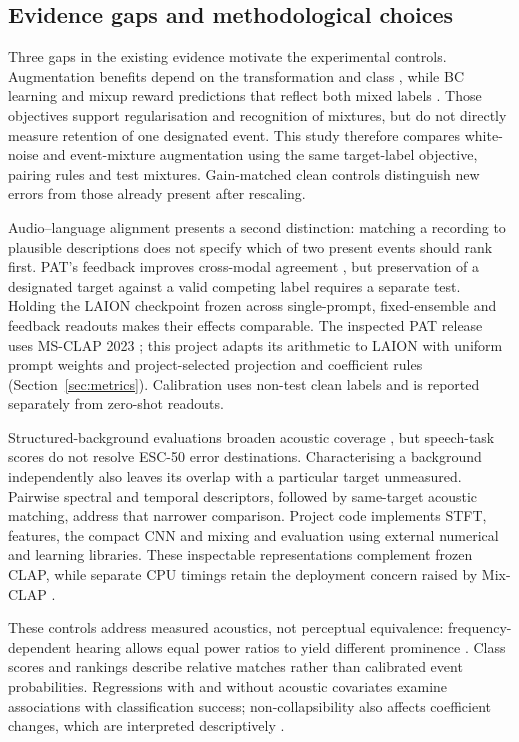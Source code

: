 \documentclass[a4paper,10pt]{article}
\begin{document}
\subsection{Evidence gaps and methodological choices}

Three gaps in the existing evidence motivate the experimental controls. Augmentation benefits depend on the transformation and class \cite{augmentation}, while BC learning and mixup reward predictions that reflect both mixed labels \cite{bc,mixup}. Those objectives support regularisation and recognition of mixtures, but do not directly measure retention of one designated event. This study therefore compares white-noise and event-mixture augmentation using the same target-label objective, pairing rules and test mixtures. Gain-matched clean controls distinguish new errors from those already present after rescaling.

Audio--language alignment presents a second distinction: matching a recording to plausible descriptions does not specify which of two present events should rank first. PAT's feedback improves cross-modal agreement \cite{pat}, but preservation of a designated target against a valid competing label requires a separate test. Holding the LAION checkpoint frozen across single-prompt, fixed-ensemble and feedback readouts makes their effects comparable. The inspected PAT release uses MS-CLAP 2023 \cite{pat,msclap}; this project adapts its arithmetic to LAION with uniform prompt weights and project-selected projection and coefficient rules (Section~\ref{sec:metrics}). Calibration uses non-test clean labels and is reported separately from zero-shot readouts.

Structured-background evaluations broaden acoustic coverage \cite{rsa,aip}, but speech-task scores do not resolve ESC-50 error destinations. Characterising a background independently also leaves its overlap with a particular target unmeasured. Pairwise spectral and temporal descriptors, followed by same-target acoustic matching, address that narrower comparison. Project code implements STFT, features, the compact CNN and mixing and evaluation using external numerical and learning libraries. These inspectable representations complement frozen CLAP, while separate CPU timings retain the deployment concern raised by Mix-CLAP \cite{mixclap}.

These controls address measured acoustics, not perceptual equivalence: frequency-dependent hearing allows equal power ratios to yield different prominence \cite{course6}. Class scores and rankings describe relative matches rather than calibrated event probabilities. Regressions with and without acoustic covariates examine associations with classification success; non-collapsibility also affects coefficient changes, which are interpreted descriptively \cite{noncollapsibility}.
\end{document}
